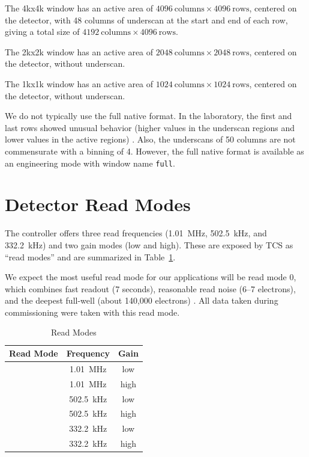 \documentclass{article}
\newcommand{\code}[1]{{\ttfamily #1}}
\begin{document}
The \code{4kx4k} window has an active area of $4096~\mbox{columns} \times 4096~\mbox{rows}$, centered on the detector, with 48 columns of underscan at the start and end of each row, giving a total size of $4192~\mbox{columns} \times 4096~\mbox{rows}$.

The \code{2kx2k} window has an active area of $2048~\mbox{columns} \times 2048~\mbox{rows}$, centered on the detector, without underscan.

The \code{1kx1k} window has an active area of $1024~\mbox{columns} \times 1024~\mbox{rows}$, centered on the detector, without underscan.

We do not typically use the full native format. In the laboratory, the first and last rows showed unusual behavior (higher values in the underscan regions and lower values in the active regions) \cite{laboratory}. Also, the underscans of 50 columns are not commensurate with a binning of 4.  However, the full native format is available as an engineering mode with window name \verb|full|.

\clearpage
\section{Detector Read Modes}

The controller offers three read frequencies (1.01~MHz, 502.5~kHz, and 332.2~kHz) and two gain modes (low and high). These are exposed by TCS as “read modes” and are summarized in Table~\ref{table:read-modes}. 

We expect the most useful read mode for our applications will be read mode 0, which combines fast readout (7 seconds), reasonable read noise (6--7 electrons), and the deepest full-well (about 140,000 electrons) \cite{laboratory}. All data taken during commissioning were taken with this read mode.

\begin{table}[pb]
\begin{center}
\caption{Read Modes}
\label{table:read-modes}
\medskip    
\begin{tabular}{ccc}
\hline
Read Mode&Frequency&Gain\\
\hline
\code{0}&1.01~MHz&low\\
\code{1}&1.01~MHz&high\\
\code{2}&502.5~kHz&low\\
\code{3}&502.5~kHz&high\\
\code{4}&332.2~kHz&low\\
\code{5}&332.2~kHz&high\\
\hline
\end{tabular}
\end{center}
\end{table}
\end{document}
